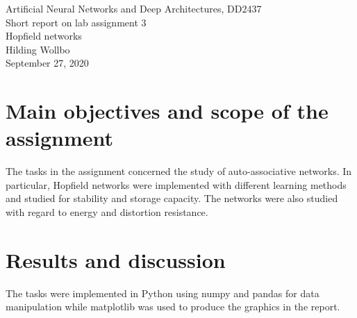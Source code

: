 \documentclass[a4paper]{article}
\begin{document}
\begin{center}
  {\large Artificial Neural Networks and Deep Architectures, DD2437}\\
  \vspace{7mm}
  {\huge Short report on lab assignment 3\\[1ex]}
  {\Large Hopfield networks}\\
  \vspace{8mm}  
  {\Large Hilding Wollbo\\}
  \vspace{4mm}
  {\large September 27, 2020\\}
\end{center}


\section{Main objectives and scope of the assignment}
The tasks in the assignment concerned the study of auto-associative networks. In particular, Hopfield networks were implemented with different learning methods and studied for stability and storage capacity. The networks were also studied with regard to energy and distortion resistance.
\section{Results and discussion}
The tasks were implemented in Python using numpy and pandas for data manipulation while matplotlib was used to produce the graphics in the report.
\end{document}
